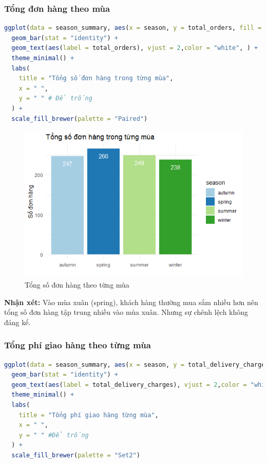 \subsubsection{Tổng đơn hàng theo mùa}
\begin{lstlisting}[language=R, caption=Đồ thị thể hiện tổng số đơn hàng theo từng mùa]
ggplot(data = season_summary, aes(x = season, y = total_orders, fill = season)) +
  geom_bar(stat = "identity") +
  geom_text(aes(label = total_orders), vjust = 2,color = "white", ) +
  theme_minimal() +
  labs(
    title = "Tổng số đơn hàng trong từng mùa",
    x = " ",
    y = " " # Để trống
  ) +
  scale_fill_brewer(palette = "Paired")
\end{lstlisting}

\begin{figure}[!ht]
    \centering \includegraphics[width=15cm]{Images/img/4.3_plotting_data/1-total_order.png}
    \caption{Tổng số đơn hàng theo từng mùa}
    
\end{figure}
\begin{boxH}
\textbf{Nhận xét:} Vào mùa xuân (spring), khách hàng thường mua sắm nhiều hơn nên tổng số đơn hàng tập trung nhiều vào mùa xuân. Nhưng sự chênh lệch không đáng kể.
\end{boxH}
\subsubsection{Tổng phí giao hàng theo từng mùa}
\begin{lstlisting}[language=R, caption=Đồ thị Tổng chi phí giao hàng theo từng mùa]
ggplot(data = season_summary, aes(x = season, y = total_delivery_charges, fill = season)) +
  geom_bar(stat = "identity") +
  geom_text(aes(label = total_delivery_charges), vjust = 2,color = "white", ) +
  theme_minimal() +
  labs(
    title = "Tổng phí giao hàng từng mùa",
    x = " ",
    y = " " #Để trống
  ) +
  scale_fill_brewer(palette = "Set2")

\end{lstlisting}

